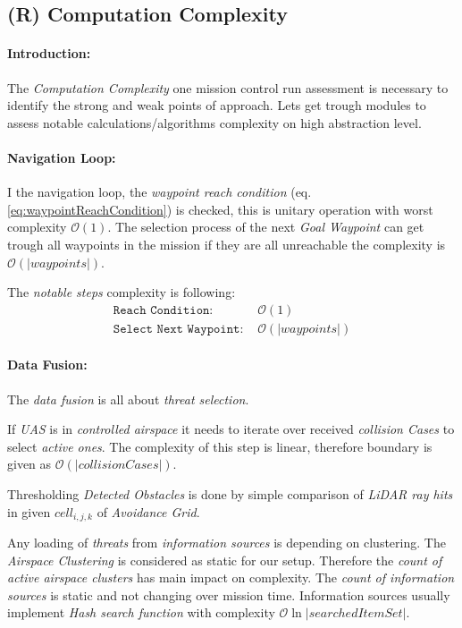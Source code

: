 \newpage
\subsection{(R) Computation Complexity}\label{sec:MCRcomputationalComplexity}
\paragraph{Introduction:}The \emph{Computation Complexity} one mission control run assessment is necessary to identify the strong and weak points of approach. Lets get trough modules to assess notable calculations/algorithms complexity on high abstraction level.

\paragraph{Navigation Loop:} I the navigation loop, the \emph{waypoint reach condition} (eq. \ref{eq:waypointReachCondition}) is checked, this is unitary operation with worst complexity $\mathscr{O}(1)$. The selection process of the next \emph{Goal Waypoint} can get trough all waypoints in the mission if they are all unreachable the complexity is $\mathscr{O}(|waypoints|)$.

The \emph{notable steps} complexity is following:
\begin{equation*}
    \begin{aligned}
        \texttt{Reach Condition: }& \mathscr{O}(1)\\
        \texttt{Select Next Waypoint: }&\mathscr{O}(|waypoints|)
    \end{aligned}
\end{equation*}

\paragraph{Data Fusion:} The \emph{data fusion} is all about \emph{threat selection}. 

If \emph{UAS} is in \emph{controlled airspace} it needs to iterate over received \emph{collision Cases} to select \emph{active ones}. The complexity of this step is linear, therefore boundary is given as $\mathscr{O} (|collision Cases|)$.

Thresholding \emph{Detected Obstacles} is done by simple comparison of \emph{LiDAR ray hits} in given $cell_{i,j,k}$ of \emph{Avoidance Grid}.

Any loading of \emph{threats} from \emph{information sources} is depending on clustering. The \emph{Airspace Clustering} is considered as static for our setup. Therefore the \emph{count of active airspace clusters} has main impact on complexity. The \emph{count of information sources} is static and not changing over mission time. Information sources usually implement \emph{Hash search function} with complexity $\mathscr{O}\ln|searched Item Set|$.

